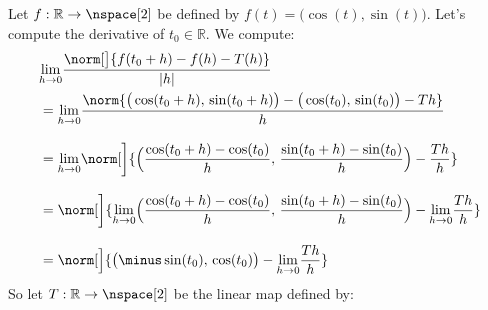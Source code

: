 \documentclass{book}                                                           %
\begin{document}
                \begin{example}
                    Let $f:\mathbb{R}\rightarrow\nspace[2]$ be defined by
                    $f(t)=\big(\cos(t),\sin(t)\big)$. Let's compute the
                    derivative of $t_{0}\in\mathbb{R}$. We compute:
                    \begin{subequations}
                        \begin{align}
                            &\nonumber\underset{h\rightarrow{0}}{\lim}
                                \frac{%
                                    \norm[\big]{%
                                        f(t_{0}+h)-f(h)-T(h)
                                    }
                                }{|h|}\\
                            &=\underset{h\rightarrow{0}}{\lim}
                            \frac{%
                                \norm{%
                                    \big(\cos(t_{0}+h),\,\sin(t_{0}+h)\big)-
                                    \big(\cos(t_{0}),\,\sin(t_{0})\big)-Th%
                                }%
                            }{h}\\[2ex]
                            &=\underset{h\rightarrow{0}}{\lim}\norm[\bigg]{%
                                \Big(%
                                    \frac{\cos(t_{0}+h)-\cos(t_{0})}{h},\,
                                    \frac{\sin(t_{0}+h)-\sin(t_{0})}{h}
                                \Big)-\frac{Th}{h}
                            }\\[2ex]
                            &=\norm[\bigg]{%
                                \underset{h\rightarrow{0}}{\lim}\Big(%
                                    \frac{\cos(t_{0}+h)-\cos(t_{0})}{h},\,
                                    \frac{\sin(t_{0}+h)-\sin(t_{0})}{h}
                                \Big)
                                -\underset{h\rightarrow{0}}{\lim}\frac{Th}{h}
                            }\\[2ex]
                            &=\norm[\Big]{%
                                \big(\minus\sin(t_{0}),\,\cos(t_{0})\big)-
                                \underset{h\rightarrow{0}}{\lim}\frac{Th}{h}
                            }
                        \end{align}
                    \end{subequations}
                    So let $T:\mathbb{R}\rightarrow\nspace[2]$ be the linear map
                    defined by:
                    \begin{equation}

\end{equation}
\end{example}
\end{document}
